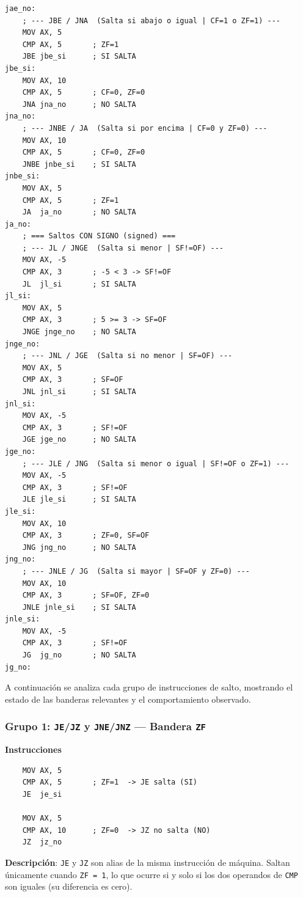 \documentclass[a4paper,12pt]{article}
\begin{document}
\begin{lstlisting}[style=assemblyStyle,
  caption={Código completo del Ejercicio~2: verificación de saltos condicionales.},
  label={lst:ejercicio2}]
jae_no:
    ; --- JBE / JNA  (Salta si abajo o igual | CF=1 o ZF=1) ---
    MOV AX, 5
    CMP AX, 5       ; ZF=1
    JBE jbe_si      ; SI SALTA
jbe_si:
    MOV AX, 10
    CMP AX, 5       ; CF=0, ZF=0
    JNA jna_no      ; NO SALTA
jna_no:
    ; --- JNBE / JA  (Salta si por encima | CF=0 y ZF=0) ---
    MOV AX, 10
    CMP AX, 5       ; CF=0, ZF=0
    JNBE jnbe_si    ; SI SALTA
jnbe_si:
    MOV AX, 5
    CMP AX, 5       ; ZF=1
    JA  ja_no       ; NO SALTA
ja_no:
    ; === Saltos CON SIGNO (signed) ===
    ; --- JL / JNGE  (Salta si menor | SF!=OF) ---
    MOV AX, -5
    CMP AX, 3       ; -5 < 3 -> SF!=OF
    JL  jl_si       ; SI SALTA
jl_si:
    MOV AX, 5
    CMP AX, 3       ; 5 >= 3 -> SF=OF
    JNGE jnge_no    ; NO SALTA
jnge_no:
    ; --- JNL / JGE  (Salta si no menor | SF=OF) ---
    MOV AX, 5
    CMP AX, 3       ; SF=OF
    JNL jnl_si      ; SI SALTA
jnl_si:
    MOV AX, -5
    CMP AX, 3       ; SF!=OF
    JGE jge_no      ; NO SALTA
jge_no:
    ; --- JLE / JNG  (Salta si menor o igual | SF!=OF o ZF=1) ---
    MOV AX, -5
    CMP AX, 3       ; SF!=OF
    JLE jle_si      ; SI SALTA
jle_si:
    MOV AX, 10
    CMP AX, 3       ; ZF=0, SF=OF
    JNG jng_no      ; NO SALTA
jng_no:
    ; --- JNLE / JG  (Salta si mayor | SF=OF y ZF=0) ---
    MOV AX, 10
    CMP AX, 3       ; SF=OF, ZF=0
    JNLE jnle_si    ; SI SALTA
jnle_si:
    MOV AX, -5
    CMP AX, 3       ; SF!=OF
    JG  jg_no       ; NO SALTA
jg_no:
\end{lstlisting}

A continuación se analiza cada grupo de instrucciones de salto, mostrando el estado de las banderas relevantes y el comportamiento observado.

\subsubsection*{Grupo 1: \texttt{JE}/\texttt{JZ} y \texttt{JNE}/\texttt{JNZ} — Bandera \texttt{ZF}}

\begin{instruccionbox}
\textbf{Instrucciones}
\begin{lstlisting}
    MOV AX, 5
    CMP AX, 5       ; ZF=1  -> JE salta (SI)
    JE  je_si

    MOV AX, 5
    CMP AX, 10      ; ZF=0  -> JZ no salta (NO)
    JZ  jz_no
\end{lstlisting}
\textbf{Descripción}: \texttt{JE} y \texttt{JZ} son alias de la misma instrucción de máquina. Saltan únicamente cuando \texttt{ZF = 1}, lo que ocurre si y solo si los dos operandos de \texttt{CMP} son iguales (su diferencia es cero).
\end{instruccionbox}
\end{document}
